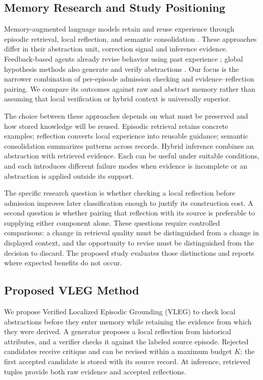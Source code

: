 \documentclass[onecolumn]{IEEEtran}
\numberwithin{equation}{section}
\theoremstyle{definition}
\theoremstyle{remark}
\begin{document}
\subsection{Memory Research and Study Positioning}
Memory-augmented language models retain and reuse experience through episodic retrieval, local reflection, and semantic consolidation \cite{wu2025from,zhang2024survey}. These approaches differ in their abstraction unit, correction signal and inference evidence. Feedback-based agents already revise behavior using past experience \cite{shinn2023reflexion,wang2024voyager}; global hypothesis methods also generate and verify abstractions \cite{agarwal2026hypothesis,he2024idea}. Our focus is the narrower combination of per-episode admission checking and evidence--reflection pairing. We compare its outcomes against raw and abstract memory rather than assuming that local verification or hybrid context is universally superior.

The choice between these approaches depends on what must be preserved and how stored knowledge will be reused. Episodic retrieval retains concrete examples; reflection converts local experience into reusable guidance; semantic consolidation summarizes patterns across records. Hybrid inference combines an abstraction with retrieved evidence. Each can be useful under suitable conditions, and each introduces different failure modes when evidence is incomplete or an abstraction is applied outside its support.

The specific research question is whether checking a local reflection before admission improves later classification enough to justify its construction cost. A second question is whether pairing that reflection with its source is preferable to supplying either component alone. These questions require controlled comparisons: a change in retrieval quality must be distinguished from a change in displayed context, and the opportunity to revise must be distinguished from the decision to discard. The proposed study evaluates those distinctions and reports where expected benefits do not occur.

\subsection{Proposed VLEG Method}
We propose Verified Localized Episodic Grounding (VLEG) to check local abstractions before they enter memory while retaining the evidence from which they were derived. A generator proposes a local reflection from historical attributes, and a verifier checks it against the labeled source episode. Rejected candidates receive critique and can be revised within a maximum budget $K$; the first accepted candidate is stored with its source record. At inference, retrieved tuples provide both raw evidence and accepted reflections.
\end{document}
